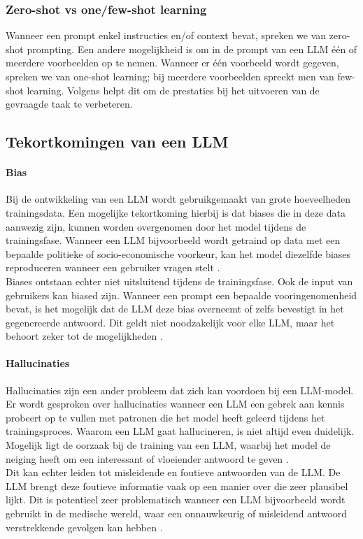 \subsubsection{Zero-shot vs one/few-shot learning}

Wanneer een prompt enkel instructies en/of context bevat, spreken we van zero-shot prompting. Een andere mogelijkheid is om in de prompt van een LLM één of meerdere voorbeelden op te nemen. Wanneer er één voorbeeld wordt gegeven, spreken we van one-shot learning; bij meerdere voorbeelden spreekt men van few-shot learning. Volgens \textcite{Marvin2024} helpt dit om de prestaties bij het uitvoeren van de gevraagde taak te verbeteren.

\subsection{Tekortkomingen van een LLM}

\paragraph{Bias}
Bij de ontwikkeling van een LLM wordt gebruikgemaakt van grote hoeveelheden trainingsdata. Een mogelijke tekortkoming hierbij is dat biases die in deze data aanwezig zijn, kunnen worden overgenomen door het model tijdens de trainingsfase. Wanneer een LLM bijvoorbeeld wordt getraind op data met een bepaalde politieke of socio-economische voorkeur, kan het model diezelfde biases reproduceren wanneer een gebruiker vragen stelt \autocite{Hadi2023}.
\\[1em]
Biases ontstaan echter niet uitsluitend tijdens de trainingsfase. Ook de input van gebruikers kan biased zijn. Wanneer een prompt een bepaalde vooringenomenheid bevat, is het mogelijk dat de LLM deze bias overneemt of zelfs bevestigt in het gegenereerde antwoord. Dit geldt niet noodzakelijk voor elke LLM, maar het behoort zeker tot de mogelijkheden \autocite{Hadi2023}.

\paragraph{Hallucinaties}
Hallucinaties zijn een ander probleem dat zich kan voordoen bij een LLM-model. Er wordt gesproken over hallucinaties wanneer een LLM een gebrek aan kennis probeert op te vullen met patronen die het model heeft geleerd tijdens het trainingsproces. Waarom een LLM gaat hallucineren, is niet altijd even duidelijk. Mogelijk ligt de oorzaak bij de training van een LLM, waarbij het model de neiging heeft om een interessant of vloeiender antwoord te geven \autocite{Hadi2023}.
\\[1em]
Dit kan echter leiden tot misleidende en foutieve antwoorden van de LLM. De LLM brengt deze foutieve informatie vaak op een manier over die zeer plausibel lijkt. Dit is potentieel zeer problematisch wanneer een LLM bijvoorbeeld wordt gebruikt in de medische wereld, waar een onnauwkeurig of misleidend antwoord verstrekkende gevolgen kan hebben \autocite{Ji2023}.

